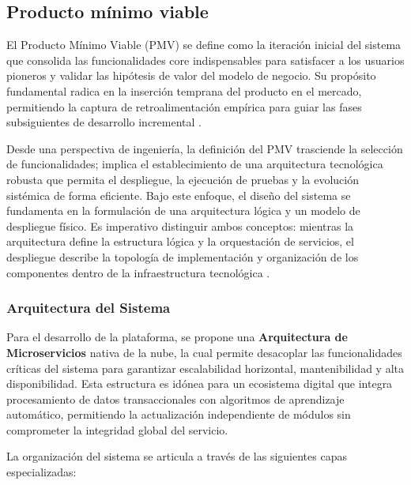 {}
\subsection*{Producto mínimo viable}

El Producto Mínimo Viable (PMV) se define como la iteración inicial del sistema que consolida las funcionalidades core indispensables para satisfacer a los usuarios pioneros y validar las hipótesis de valor del modelo de negocio. Su propósito fundamental radica en la inserción temprana del producto en el mercado, permitiendo la captura de retroalimentación empírica para guiar las fases subsiguientes de desarrollo incremental \parencite{IntuitChamp01}.

Desde una perspectiva de ingeniería, la definición del PMV trasciende la selección de funcionalidades; implica el establecimiento de una arquitectura tecnológica robusta que permita el despliegue, la ejecución de pruebas y la evolución sistémica de forma eficiente. Bajo este enfoque, el diseño del sistema se fundamenta en la formulación de una arquitectura lógica y un modelo de despliegue físico. Es imperativo distinguir ambos conceptos: mientras la arquitectura define la estructura lógica y la orquestación de servicios, el despliegue describe la topología de implementación y organización de los componentes dentro de la infraestructura tecnológica \parencite{BBVA04}.

{}
\subsubsection*{Arquitectura del Sistema}

Para el desarrollo de la plataforma, se propone una \textbf{Arquitectura de Microservicios} nativa de la nube, la cual permite desacoplar las funcionalidades críticas del sistema para garantizar escalabilidad horizontal, mantenibilidad y alta disponibilidad. Esta estructura es idónea para un ecosistema digital que integra procesamiento de datos transaccionales con algoritmos de aprendizaje automático, permitiendo la actualización independiente de módulos sin comprometer la integridad global del servicio.

La organización del sistema se articula a través de las siguientes capas especializadas:

